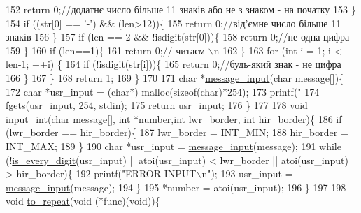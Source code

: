 \begin{DoxyCodeInclude}
152         \textcolor{keywordflow}{return} 0;\textcolor{comment}{//додатнє число більше 11 знаків або не з знаком - на початку}
153     \}
154     \textcolor{keywordflow}{if} ((str[0] == \textcolor{charliteral}{'-'}) && (len>12))\{
155         \textcolor{keywordflow}{return} 0;\textcolor{comment}{//від'ємне число більше 11 знаків}
156     \}
157     \textcolor{keywordflow}{if} (len == 2 && !isdigit(str[0]))\{
158         \textcolor{keywordflow}{return} 0;\textcolor{comment}{//не одна цифра}
159     \}
160     \textcolor{keywordflow}{if} (len==1)\{
161         \textcolor{keywordflow}{return} 0;\textcolor{comment}{// читаєм \(\backslash\)n}
162     \}
163     \textcolor{keywordflow}{for} (\textcolor{keywordtype}{int} i = 1; i < len-1; ++i) \{
164         \textcolor{keywordflow}{if} (!isdigit(str[i]))\{
165             \textcolor{keywordflow}{return} 0;\textcolor{comment}{//будь-який знак - не цифра}
166         \}
167     \}
168     \textcolor{keywordflow}{return} 1;
169 \}
170 
171 \textcolor{keywordtype}{char} *\hyperlink{main_8c_a638293d509eded9d6ef7552ae1b17f2b}{message\_input}(\textcolor{keywordtype}{char} message[])\{
172     \textcolor{keywordtype}{char} *usr\_input = (\textcolor{keywordtype}{char}*) malloc(\textcolor{keyword}{sizeof}(\textcolor{keywordtype}{char})*254);
173     printf(\textcolor{stringliteral}{"%
174     fgets(usr\_input, 254, stdin);
175     \textcolor{keywordflow}{return} usr\_input;
176 \}
177 
178 \textcolor{keywordtype}{void} \hyperlink{main_8c_a6f453bc035d85e967bd5032eca31a155}{input\_int}(\textcolor{keywordtype}{char} message[], \textcolor{keywordtype}{int} *number,\textcolor{keywordtype}{int} lwr\_border, \textcolor{keywordtype}{int} hir\_border)\{
186     \textcolor{keywordflow}{if} (lwr\_border == hir\_border)\{
187         lwr\_border = INT\_MIN;
188         hir\_border = INT\_MAX;
189     \}
190     \textcolor{keywordtype}{char} *usr\_input = \hyperlink{main_8c_a638293d509eded9d6ef7552ae1b17f2b}{message\_input}(message);
191     \textcolor{keywordflow}{while} (!\hyperlink{main_8c_a9594b83ee908d195f5ff508da5c23c58}{is\_every\_digit}(usr\_input) || atoi(usr\_input) < lwr\_border || atoi(usr\_input) > 
      hir\_border)\{
192         printf(\textcolor{stringliteral}{"ERROR INPUT\(\backslash\)n"});
193         usr\_input = \hyperlink{main_8c_a638293d509eded9d6ef7552ae1b17f2b}{message\_input}(message);
194     \}
195     *number = atoi(usr\_input);
196 \}
197 
198 \textcolor{keywordtype}{void} \hyperlink{main_8c_a590198f8fc1086cc47278ee8ddfa08d2}{to\_repeat}(\textcolor{keywordtype}{void} (*func)(\textcolor{keywordtype}{void}))\{
}
\end{DoxyCodeInclude}
